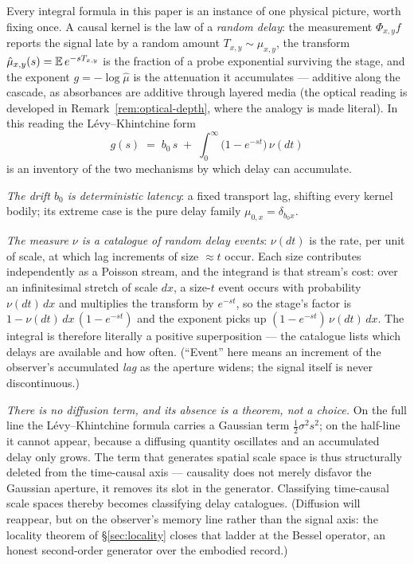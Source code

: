 \begin{remark}\label{rem:delay-dictionary}
Every integral formula in this paper is an instance of one physical picture, worth
fixing once. A causal kernel is the law of a \emph{random delay}: the measurement
$\Phi_{x,y}f$ reports the signal late by a random amount $T_{x,y} \sim \mu_{x,y}$,
the transform $\hat\mu_{x,y}(s) = \mathbb{E}\, e^{-sT_{x,y}}$ is the fraction of a probe
exponential surviving the stage, and the exponent $g = -\log\hat\mu$ is the
attenuation it accumulates --- additive along the cascade, as absorbances are
additive through layered media (the optical reading is developed in
Remark~\ref{rem:optical-depth}, where the analogy is made literal). In this reading
the Lévy--Khintchine form
\[
  g(s) \;=\; b_0\,s \;+\; \int_0^\infty \bigl(1 - e^{-st}\bigr)\,\nu(dt)
\]
is an inventory of the two mechanisms by which delay can accumulate.

\emph{The drift $b_0$ is deterministic latency}: a fixed transport lag, shifting
every kernel bodily; its extreme case is the pure delay family
$\mu_{0,x} = \delta_{b_0 x}$.

\emph{The measure $\nu$ is a catalogue of random delay events}: $\nu(dt)$ is the
rate, per unit of scale, at which lag increments of size $\approx t$ occur. Each
size contributes independently as a Poisson stream, and the integrand is that
stream's cost: over an infinitesimal stretch of scale $dx$, a size-$t$ event
occurs with probability $\nu(dt)\,dx$ and multiplies the transform by $e^{-st}$,
so the stage's factor is $1 - \nu(dt)\,dx\,(1 - e^{-st})$ and the exponent picks
up $(1 - e^{-st})\,\nu(dt)\,dx$. The integral is therefore literally a positive
superposition --- the catalogue lists which delays are available and how often.
(``Event'' here means an increment of the observer's accumulated \emph{lag} as
the aperture widens; the signal itself is never discontinuous.)

\emph{There is no diffusion term, and its absence is a theorem, not a choice.} On
the full line the Lévy--Khintchine formula carries a Gaussian term
$\tfrac12\sigma^2 s^2$; on the half-line it cannot appear, because a diffusing
quantity oscillates and an accumulated delay only grows. The term that generates
spatial scale space is thus structurally deleted from the time-causal axis ---
causality does not merely disfavor the Gaussian aperture, it removes its slot in
the generator. Classifying time-causal scale spaces thereby becomes classifying
delay catalogues. (Diffusion will reappear, but on the observer's memory line
rather than the signal axis: the locality theorem of \S\ref{sec:locality} closes
that ladder at the Bessel operator, an honest second-order generator over the
embodied record.)


\end{remark}
